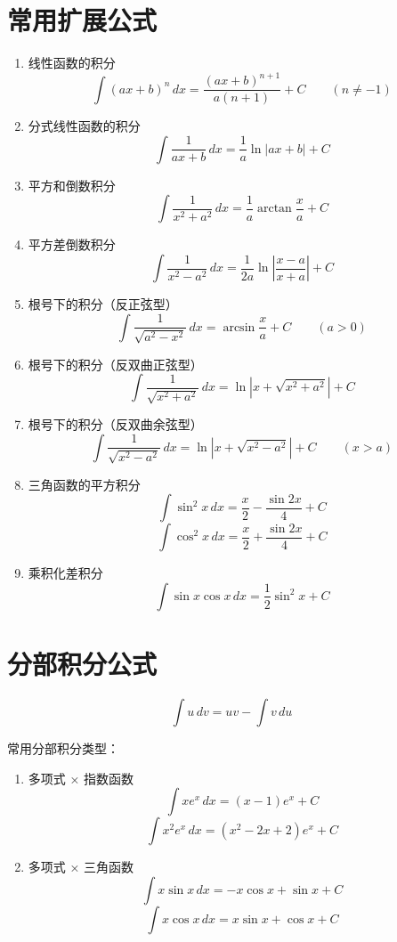 \documentclass{article}
\begin{document}
\section*{常用扩展公式}

\begin{enumerate}
    \item 线性函数的积分
    \[
    \int (ax+b)^n \, dx = \frac{(ax+b)^{n+1}}{a(n+1)} + C \qquad (n \neq -1)
    \]
    
    \item 分式线性函数的积分
    \[
    \int \frac{1}{ax+b} \, dx = \frac{1}{a} \ln |ax+b| + C
    \]
    
    \item 平方和倒数积分
    \[
    \int \frac{1}{x^2 + a^2} \, dx = \frac{1}{a} \arctan \frac{x}{a} + C
    \]
    
    \item 平方差倒数积分
    \[
    \int \frac{1}{x^2 - a^2} \, dx = \frac{1}{2a} \ln \left| \frac{x-a}{x+a} \right| + C
    \]
    
    \item 根号下的积分（反正弦型）
    \[
    \int \frac{1}{\sqrt{a^2 - x^2}} \, dx = \arcsin \frac{x}{a} + C \qquad (a > 0)
    \]
    
    \item 根号下的积分（反双曲正弦型）
    \[
    \int \frac{1}{\sqrt{x^2 + a^2}} \, dx = \ln \left| x + \sqrt{x^2 + a^2} \right| + C
    \]
    
    \item 根号下的积分（反双曲余弦型）
    \[
    \int \frac{1}{\sqrt{x^2 - a^2}} \, dx = \ln \left| x + \sqrt{x^2 - a^2} \right| + C \qquad (x > a)
    \]
    
    \item 三角函数的平方积分
    \[
    \int \sin^2 x \, dx = \frac{x}{2} - \frac{\sin 2x}{4} + C
    \]
    \[
    \int \cos^2 x \, dx = \frac{x}{2} + \frac{\sin 2x}{4} + C
    \]
    
    \item 乘积化差积分
    \[
    \int \sin x \cos x \, dx = \frac{1}{2} \sin^2 x + C
    \]
\end{enumerate}

\section*{分部积分公式}

\[
\int u \, dv = uv - \int v \, du
\]

常用分部积分类型：

\begin{enumerate}
    \item 多项式 × 指数函数
    \[
    \int x e^x \, dx = (x-1)e^x + C
    \]
    \[
    \int x^2 e^x \, dx = (x^2 - 2x + 2)e^x + C
    \]
    
    \item 多项式 × 三角函数
    \[
    \int x \sin x \, dx = -x \cos x + \sin x + C
    \]
    \[
    \int x \cos x \, dx = x \sin x + \cos x + C
    \]
\end{enumerate}
\end{document}
